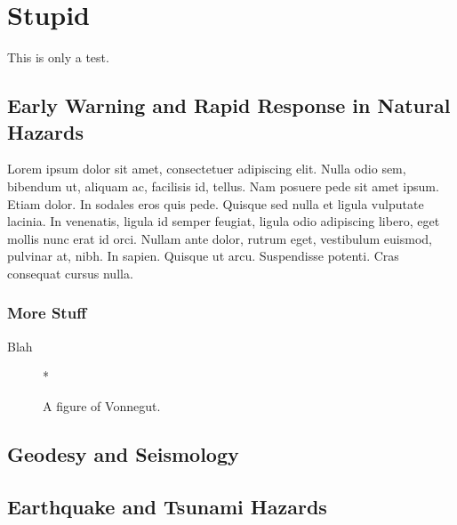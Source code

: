 
\chapter{Stupid}
This is only a test.
\section{Early Warning and Rapid Response in Natural Hazards}
Lorem ipsum \cite{Agnew2007} dolor sit amet, consectetuer adipiscing elit. Nulla odio
sem, bibendum ut, aliquam ac, facilisis id, tellus. Nam posuere pede
sit amet ipsum. Etiam dolor. In sodales eros quis pede.  Quisque sed
nulla et ligula vulputate lacinia. In venenatis, ligula id semper
feugiat, ligula odio adipiscing libero, eget mollis nunc erat id orci.
Nullam ante dolor, rutrum eget, vestibulum euismod, pulvinar at, nibh.
In sapien. Quisque ut arcu. Suspendisse potenti. Cras consequat cursus
nulla.
\subsection{More Stuff}
Blah

\begin{figure}[h] 
  \centering
  *
  \caption{A figure of Vonnegut.} 
\end{figure}

\section{Geodesy and Seismology}

\section{Earthquake and Tsunami Hazards}



